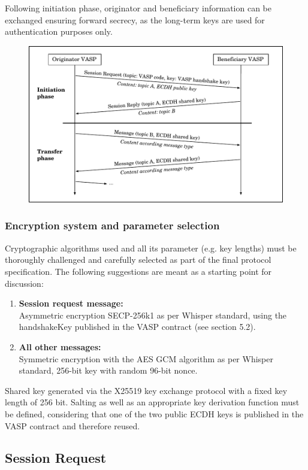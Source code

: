\documentclass{article}
\begin{document}
Following initiation phase, originator and beneficiary information can be exchanged ensuring forward secrecy, as the long-term keys are used for authentication purposes only.
\begin{figure}[h]
    \centering
    \includegraphics[width=\textwidth]{g19.pdf}
\end{figure}
\subsubsection{Encryption system and parameter selection}

Cryptographic algorithms used and all its parameter (e.g. key lengths) must be thoroughly challenged and carefully selected as part of the final protocol specification. The following suggestions are meant as a starting point for discussion:
\begin{enumerate}
    \item \textbf{Session request message:}\\
    Asymmetric encryption SECP-256k1 as per Whisper standard, using the handshakeKey published in the VASP contract (see section 5.2).
    \item \textbf{All other messages:}\\
    Symmetric encryption with the AES GCM algorithm as per Whisper standard, 256-bit key with random 96-bit nonce.
\end{enumerate}
Shared key generated via the X25519 key exchange protocol with a fixed key length of 256 bit. Salting as well as an appropriate key derivation function must be defined, considering that one of the two public ECDH keys is published in the VASP contract and therefore reused.

\subsection{Session Request}
\end{document}
